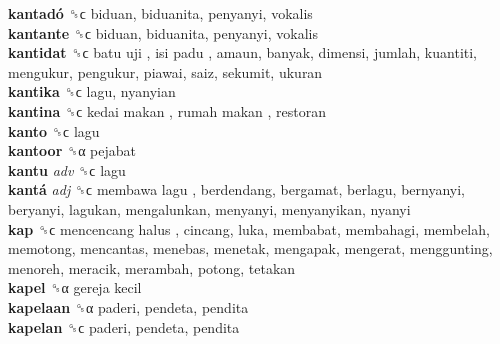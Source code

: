 \textbf{kantadó} ␝ϲ  biduan, biduanita, penyanyi, vokalis  \\
\textbf{kantante} ␝ϲ  biduan, biduanita, penyanyi, vokalis  \\
\textbf{kantidat} ␝ϲ   batu uji ,  isi padu , amaun, banyak, dimensi, jumlah, kuantiti, mengukur, pengukur, piawai, saiz, sekumit, ukuran  \\
\textbf{kantika} ␝ϲ  lagu, nyanyian  \\
\textbf{kantina} ␝ϲ   kedai makan ,  rumah makan , restoran  \\
\textbf{kanto} ␝ϲ  lagu  \\
\textbf{kantoor} ␝α  pejabat  \\
\textbf{kantu} \emph{adv}  ␝ϲ  lagu  \\
\textbf{kantá} \emph{adj}  ␝ϲ   membawa lagu , berdendang, bergamat, berlagu, bernyanyi, beryanyi, lagukan, mengalunkan, menyanyi, menyanyikan, nyanyi  \\
\textbf{kap} ␝ϲ   mencencang halus , cincang, luka, membabat, membahagi, membelah, memotong, mencantas, menebas, menetak, mengapak, mengerat, menggunting, menoreh, meracik, merambah, potong, tetakan  \\
\textbf{kapel} ␝α   gereja kecil   \\
\textbf{kapelaan} ␝α  paderi, pendeta, pendita  \\
\textbf{kapelan} ␝ϲ  paderi, pendeta, pendita  \\
